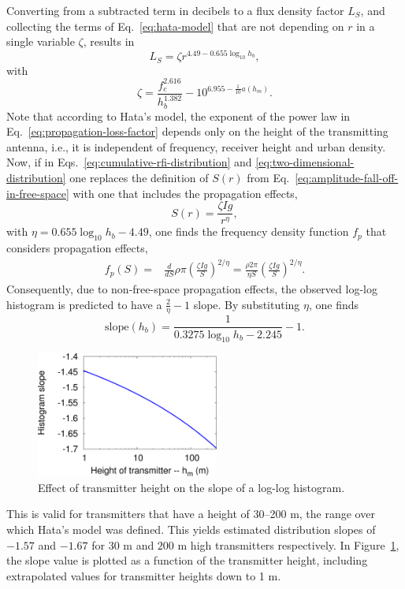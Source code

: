 \documentclass[useAMS,usenatbib]{mn2e}
\begin{document}
Converting from a subtracted term in decibels to a flux density factor $L_S$, and collecting the terms of Eq.~\eqref{eq:hata-model} that are not depending on $r$ in a single variable $\zeta$, results in
\begin{equation} \label{eq:propagation-loss-factor}
 L_S = \zeta r^{4.49 - 0.655 \log_{10} h_b},
\end{equation}
with
\begin{equation}
 \zeta = \frac{f_c^{2.616}}{h_b^{1.382}} - 10^{6.955-\frac{1}{10} a(h_m)}.
\end{equation}
Note that according to Hata's model, the exponent of the power law in Eq.~\eqref{eq:propagation-loss-factor} depends only on the height of the transmitting antenna, i.e., it is independent of frequency, receiver height and urban density. Now, if in Eqs.~\eqref{eq:cumulative-rfi-distribution} and \eqref{eq:two-dimensional-distribution} one replaces the definition of $S(r)$ from Eq.~\eqref{eq:amplitude-fall-off-in-free-space} with one that includes the propagation effects,
\begin{equation}
 S(r) = \frac{\zeta Ig}{r^\eta},
\end{equation}
with $\eta = 0.655 \log_{10} h_b - 4.49$, one finds the frequency density function $f_p$ that considers propagation effects,
\begin{align}
f_p(S)
= & \frac{d}{dS} \rho \pi \left( \frac{\zeta Ig }{S} \right)^{2/\eta}
= \frac{\rho 2\pi}{\eta S} \left( \frac{\zeta Ig}{S} \right)^{2/\eta}.
\end{align}
Consequently, due to non-free-space propagation effects, the observed log-log histogram is predicted to have a $\frac{2}{\eta}-1$ slope. By substituting $\eta$, one finds
\begin{equation}
\textrm{slope}(h_b) = \frac{1}{0.3275 \log_{10} h_b - 2.245} - 1.
\end{equation}
\begin{figure}
\begin{center}\hspace{-1cm}\includegraphics[width=6cm]{img/transmitter-height/plot-transmitter-height-trimmed}
\caption{Effect of transmitter height on the slope of a log-log histogram.}
\label{fig:plot-transmitter-height}
\end{center}
\end{figure}
This is valid for transmitters that have a height of 30--200 m, the range over which Hata's model was defined. This yields estimated distribution slopes of $-1.57$ and $-1.67$ for $30$ m and $200$ m high transmitters respectively. In Figure~\ref{fig:plot-transmitter-height}, the slope value is plotted as a function of the transmitter height, including extrapolated values for transmitter heights down to 1 m.
\end{document}
